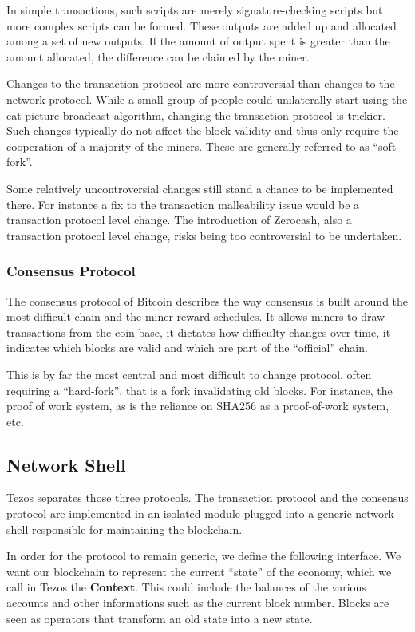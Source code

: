 \documentclass[letterpaper]{article}
\begin{document}
In simple transactions, such scripts are merely signature-checking scripts but
more complex scripts can be formed. These outputs are added up and allocated
among a set of new outputs. If the amount of output spent is greater than the
amount allocated, the difference can be claimed by the miner.

Changes to the transaction protocol are more controversial than changes to
the network protocol. While a small group of people could unilaterally start
using the cat-picture broadcast algorithm, changing the transaction protocol
is trickier. Such changes typically do not affect the block validity
and thus only require the cooperation of a majority of the miners.
These are generally referred to as ``soft-fork''.

Some relatively uncontroversial changes still stand a chance to be implemented
there. For instance a fix to the transaction malleability issue would be a
transaction protocol level change. The introduction of Zerocash, also a
transaction protocol level change, risks being too controversial to be
undertaken.

\subsubsection{Consensus Protocol}
The consensus protocol of Bitcoin describes the way consensus is built
around the most difficult chain and the miner reward schedules.
It allows miners to draw transactions from the coin base,
it dictates how difficulty changes over time,
it indicates which blocks are valid
and which are part of the ``official'' chain.

This is by far the most central and most difficult to change protocol,
often requiring a ``hard-fork'', that is a fork invalidating old blocks.
For instance, the proof of work system, as is the reliance on SHA256 as a
proof-of-work system, etc.

\subsection{Network Shell}
Tezos separates those three protocols.
The transaction protocol and the consensus protocol
are implemented in an isolated module plugged
into a generic network shell responsible for maintaining the blockchain.

In order for the protocol to remain generic, we define the following interface.
We want our blockchain to represent the current ``state'' of the economy,
which we call in Tezos the \textbf{Context}.
This could include the balances of the various accounts
and other informations such as the current block number.
Blocks are seen as operators that transform an old state into a new state.
\end{document}
